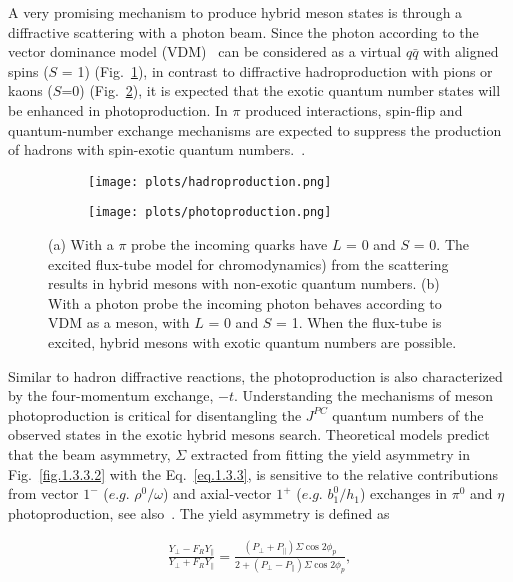  A very promising mechanism to produce hybrid meson states is through a diffractive scattering with a photon beam. Since the photon according to the vector dominance model (VDM)~\cite{Bauer78} can be considered as a virtual $q\bar{q}$ with aligned spins ($S$ = 1) (Fig.~\ref{fig.1.3.3.1.a}), in contrast to diffractive hadroproduction with pions or kaons ($S$=0) (Fig.~\ref{fig.1.3.3.1.b}), it is expected that the exotic quantum number states will be enhanced in photoproduction. In $\pi$ produced interactions, spin-flip and quantum-number exchange mechanisms are expected to suppress the production of hadrons with spin-exotic quantum numbers.~\cite{Isgur85, Szczepaniak01}.

 \begin{figure}[H]
    \centering
    \begin{subfigure}[b]{0.4\textwidth}
        \texttt{[image: plots/hadroproduction.png]}
        \caption{}
        \label{fig.1.3.3.1.a}
    \end{subfigure}\hfill
    \begin{subfigure}[b]{0.45\textwidth}
        \texttt{[image: plots/photoproduction.png]}
        \caption{}
        \label{fig.1.3.3.1.b}
    \end{subfigure}
    \caption{(a) With a $\pi$ probe the incoming quarks have $L$ = 0 and $S$ = 0. The excited flux-tube model for chromodynamics) from the scattering results in hybrid mesons with non-exotic quantum numbers. (b) With a photon probe the incoming photon behaves according to VDM as a meson, with $L$ = 0 and $S$ = 1. When the flux-tube is excited, hybrid mesons with exotic quantum numbers are possible.}
    \label{fig.1.3.3.1}
\end{figure}

Similar to hadron diffractive reactions, the photoproduction is also characterized by the four-momentum exchange, $-t$. Understanding the mechanisms of meson photoproduction is critical for disentangling the $J^{PC}$ quantum numbers of the observed states in the exotic hybrid mesons search. Theoretical models predict that the beam asymmetry, $\Sigma$ extracted from fitting the yield asymmetry in Fig.~\ref{fig.1.3.3.2} with the Eq.~\ref{eq.1.3.3}, is sensitive to the relative contributions from vector $1^{-}$ ($e.g.$ $\rho^{0}/\omega$) and axial-vector $1^{+}$ ($e.g.$ $b_{1}^{0}/h_{1}$) exchanges in $\pi^{0}$ and $\eta$ photoproduction, see also~\cite{Ghoul17}. The yield asymmetry is defined as

\begin{align}
    \frac{Y_{\perp}-F_{R}Y_{\parallel}}{Y_{\perp}+F_{R}Y_{\parallel}} = \frac{(P_{\perp}+P_{\parallel})\Sigma \cos 2\phi_{p}}{2+(P_{\perp}-P_{\parallel})\Sigma \cos 2\phi_{p}},
    \label{eq.1.3.3}
\end{align}

